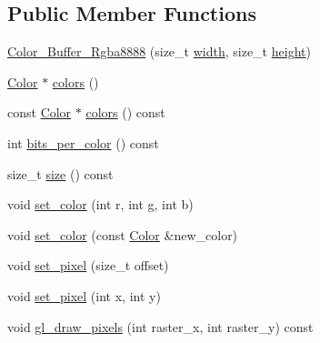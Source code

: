 \subsection*{Public Member Functions}
\begin{DoxyCompactItemize}
\item 
\mbox{\hyperlink{classrenderer_1_1_color___buffer___rgba8888_a4f45ae1ca12979b68b8cfd3df803c140}{Color\+\_\+\+Buffer\+\_\+\+Rgba8888}} (size\+\_\+t \mbox{\hyperlink{classrenderer_1_1_color___buffer_ace3fab0552b94a1d7d7afcc592cd4503}{width}}, size\+\_\+t \mbox{\hyperlink{classrenderer_1_1_color___buffer_a9a26f6f8e04447ac2b26c38e0a190714}{height}})
\item 
\mbox{\hyperlink{structrenderer_1_1_color___buffer___rgba8888_1_1_color}{Color}} $\ast$ \mbox{\hyperlink{classrenderer_1_1_color___buffer___rgba8888_a5061946117fc186aedee4747e1d1129c}{colors}} ()
\item 
const \mbox{\hyperlink{structrenderer_1_1_color___buffer___rgba8888_1_1_color}{Color}} $\ast$ \mbox{\hyperlink{classrenderer_1_1_color___buffer___rgba8888_afd85a2353b0f11ea29dfd0e48446dbb4}{colors}} () const
\item 
int \mbox{\hyperlink{classrenderer_1_1_color___buffer___rgba8888_a1f241495c36d199a64289478b92a1638}{bits\+\_\+per\+\_\+color}} () const
\item 
size\+\_\+t \mbox{\hyperlink{classrenderer_1_1_color___buffer___rgba8888_a76fda60ebe39b53c7cda3b3ee04a525a}{size}} () const
\item 
void \mbox{\hyperlink{classrenderer_1_1_color___buffer___rgba8888_abaeb5e608f4cd3803185de47558bdc58}{set\+\_\+color}} (int r, int g, int b)
\item 
void \mbox{\hyperlink{classrenderer_1_1_color___buffer___rgba8888_a8b44a3ddba4d34dfed253634d75018a5}{set\+\_\+color}} (const \mbox{\hyperlink{structrenderer_1_1_color___buffer___rgba8888_1_1_color}{Color}} \&new\+\_\+color)
\item 
void \mbox{\hyperlink{classrenderer_1_1_color___buffer___rgba8888_a99589bff538769aa5b0923274dc324cb}{set\+\_\+pixel}} (size\+\_\+t offset)
\item 
void \mbox{\hyperlink{classrenderer_1_1_color___buffer___rgba8888_aaebcb0ce419750f0673fc9d3c59b929d}{set\+\_\+pixel}} (int x, int y)
\item 
void \mbox{\hyperlink{classrenderer_1_1_color___buffer___rgba8888_afef366739856f8d429cee6ced277d167}{gl\+\_\+draw\+\_\+pixels}} (int raster\+\_\+x, int raster\+\_\+y) const
\end{DoxyCompactItemize}
